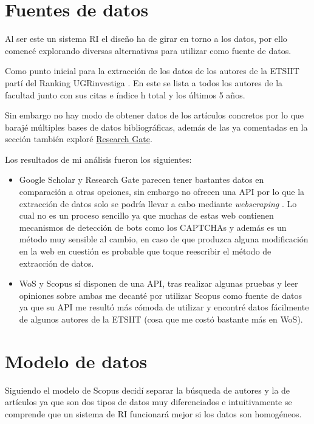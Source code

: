 \section{Fuentes de datos}
Al ser este un sistema \acrshort{RI} el diseño ha de girar en torno a los datos, por ello comencé explorando diversas alternativas para utilizar como fuente de datos. 

Como punto inicial para la extracción de los datos de los autores de la \acrshort{ETSIIT} partí del Ranking UGRinvestiga \cite{Ranking_UGRInvestiga}. En este se lista a todos los autores de la facultad junto con sus citas e índice h total y los últimos 5 años.

Sin embargo no hay modo de obtener datos de los artículos concretos por lo que barajé múltiples bases de datos bibliográficas, además de las ya comentadas en la sección  también exploré \href{https://www.researchgate.net/}{Research Gate}.

Los resultados de mi análisis fueron los siguientes: 
\label{ls:dataSourceAnalisis}
\begin{itemize}
	
	\item Google Scholar y Research Gate parecen tener bastantes datos en comparación a otras opciones, sin embargo no ofrecen una \acrshort{API} por lo que la extracción de datos solo se podría llevar a cabo mediante \textit{\gls{webscraping}} . Lo cual no es un proceso sencillo ya que muchas de estas web contienen mecanismos de detección de bots como los CAPTCHAs \cite{scrapping_GS} y además es un método muy sensible al cambio, en caso de que produzca alguna modificación en la web en cuestión es probable que toque reescribir el método de extracción de datos.
	\item \acrshort{WoS} y Scopus sí disponen de una \acrshort{API}, tras realizar algunas pruebas y leer opiniones sobre ambas me decanté por utilizar Scopus como fuente de datos ya que su \acrshort{API} me resultó más cómoda de utilizar y encontré datos fácilmente de algunos autores de la \acrshort{ETSIIT} (cosa que me costó bastante más en \acrshort{WoS}).
\end{itemize}

\section{Modelo de datos}

Siguiendo el modelo de Scopus decidí separar la búsqueda de autores y la de artículos ya que son dos tipos de datos muy diferenciados e intuitivamente se comprende que un sistema de \acrshort{RI} funcionará mejor si los datos son homogéneos.

